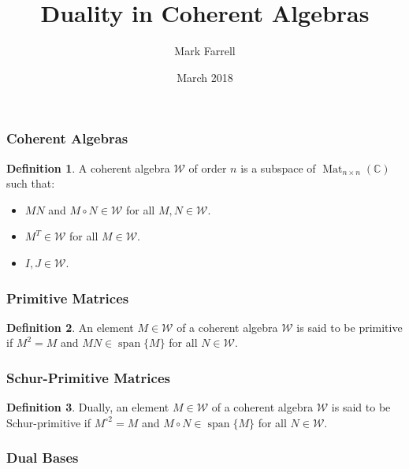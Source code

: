 \documentclass[notheorems]{beamer}
\title{Duality in Coherent Algebras}
\author{Mark Farrell}
\date{March 2018}
\theoremstyle{definition} %
\newtheorem{definition}{Definition}[section] %
\begin{document}
\begin{frame}
\titlepage
\end{frame}

\begin{frame}

\frametitle{Coherent Algebras}

	\begin{definition}

		  A coherent algebra $\mathcal{W}$ of order $n$ is a subspace of $\operatorname{Mat}_{n \times n}(\mathbb{C})$ such that:

		  \begin{itemize}
		  	\item $M N$ and $M \circ N \in \mathcal{W}$ for all $M, N \in \mathcal{W}$.
		  	\item $M^{T} \in \mathcal{W}$ for all $M \in \mathcal{W}$.
		  	\item $I, J \in \mathcal{W}$.
		  \end{itemize}

  \end{definition}

\end{frame}

\begin{frame}

\frametitle{Primitive Matrices}

	\begin{definition}
		An element $M \in \mathcal{W}$ of a coherent algebra $\mathcal{W}$ is said to be primitive if $M^{2} = M$ and $M N \in \operatorname{span} \{ M \}$ for all $N \in \mathcal{W}$.
	\end{definition}

\end{frame}

\begin{frame}

\frametitle{Schur-Primitive Matrices}

	\begin{definition}
		Dually, an element $M \in \mathcal{W}$ of a coherent algebra $\mathcal{W}$ is said to be Schur-primitive if $M^{\circ 2} = M$ and $M \circ N \in \operatorname{span} \{ M \}$ for all $N \in \mathcal{W}$.
	\end{definition}

\end{frame}

\begin{frame}

\frametitle{Dual Bases}



	\vspace{1em}


\end{frame}
\end{document}
